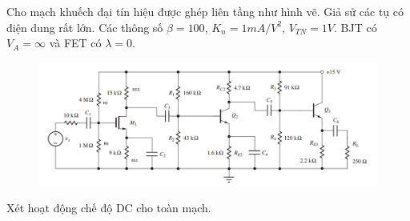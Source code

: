 
 Cho mạch khuếch đại tín hiệu được ghép liên tầng như hình vẽ. Giả sử các tụ có điện dung rất lớn. Các thông số $\beta = 100$,  $K_{n}=1 mA/V^{2}$, $V_{TN} = 1 V$. BJT có $V_{A} = \infty$  và FET có $\lambda = 0$. 
 
 \begin{figure}[H]
 	\centering
 	\includegraphics[width=.9\linewidth]{./my-chapters/my-images/Question6/DeBai.png}
 \end{figure}
 


\noindent Xét hoạt động chế độ DC cho toàn mạch.

